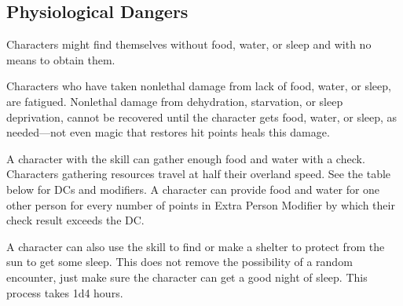 \subsection{Physiological Dangers}
Characters might find themselves without food, water, or sleep and with no means to obtain them.

Characters who have taken nonlethal damage from lack of food, water, or sleep, are fatigued. Nonlethal damage from dehydration, starvation, or sleep deprivation, cannot be recovered until the character gets food, water, or sleep, as needed---not even magic that restores hit points heals this damage.

A character with the  skill can gather enough food and water with a check. Characters gathering resources travel at half their overland speed. See the table below for DCs and modifiers. A character can provide food and water for one other person for every number of points in Extra Person Modifier by which their check result exceeds the DC.


A character can also use the  skill to find or make a shelter to protect from the sun to get some sleep. This does not remove the possibility of a random encounter, just make sure the character can get a good night of sleep. This process takes 1d4 hours.

